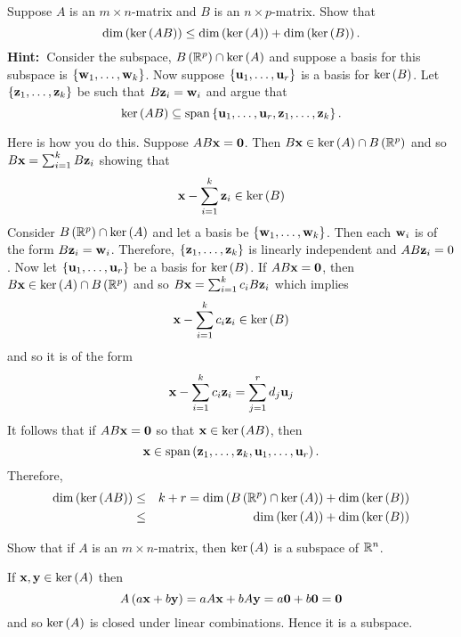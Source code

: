 \begin{enumialphparenastyle}
\begin{ex} Suppose $A$ is an $m\times n$-matrix and $B$ is an $n\times p$-matrix.
Show that 
\begin{equation*}
\dim \left(\ker \left(AB\right) \right) \leq \dim \left(\ker \left(
A\right) \right) +\dim \left(\ker \left(B\right) \right) .
\end{equation*}
\textbf{Hint:\ }Consider the subspace, $B\left(\mathbb{R}^{p}\right) \cap
\ker \left(A\right) $ and suppose a basis for this subspace is $\left\{
\mbox{\bf w}_{1},\ldots,\mbox{\bf w}_{k}\right\}$. Now suppose $\left\{
\mbox{\bf u}_{1},\ldots,\mbox{\bf u}_{r}\right\} $ is a basis for $\ker \left(
B\right)$. Let $\left\{\mbox{\bf z}_{1},\ldots,\mbox{\bf z}_{k}\right\} $ be
such that $B\mbox{\bf z}_{i}=\mbox{\bf w}_{i}$ and argue that 
\begin{equation*}
\ker \tup{AB} \subseteq \sspan\set{\vect{u}_{1},\ldots,
\vect{u}_{r},\vect{z}_{1},\ldots,\vect{z}_{k}} .
\end{equation*}
\vspace{1mm}
\begin{sol}
Here is how you do this. Suppose $AB\mbox{\bf x}=\mbox{\bf 0}$. Then $B\mbox{\bf x}\in \ker
\left(A\right) \cap B\left(\mathbb{R}^{p}\right) $ and so $B\mbox{\bf x}
=\sum_{i=1}^{k}B\mbox{\bf z}_{i}$ showing that
\[
\mbox{\bf x}-\sum_{i=1}^{k}\mbox{\bf z}_{i}\in \ker \left(B\right) 
\]
Consider $B\left(\mathbb{R}^{p}\right) \cap \ker \left(A\right) $ and let
a basis be $\left\{\mbox{\bf w}_{1},\ldots,\mbox{\bf w}_{k}\right\}$. Then
each $\mbox{\bf w}_{i}$ is of the form $B\mbox{\bf z}_{i}=\mbox{\bf w}_{i}$.
Therefore, $\left\{\mbox{\bf z}_{1},\ldots,\mbox{\bf z}_{k}\right\} $ is
linearly independent and $AB\mbox{\bf z}_{i}=0$. Now let $\left\{\mbox{\bf u}
_{1},\ldots,\mbox{\bf u}_{r}\right\} $ be a basis for $\ker \left(B\right)$.
If $AB\mbox{\bf x}=\mbox{\bf 0}$, then $B\mbox{\bf x} \in \ker \left(A\right) \cap B\left(
\mathbb{R}^{p}\right) $ and so $B\mbox{\bf x}=\sum_{i=1}^{k}c_{i}B\mbox{\bf z}
_{i}$ which implies
\[
\mbox{\bf x}-\sum_{i=1}^{k}c_{i}\mbox{\bf z}_{i}\in \ker \left(B\right)
\]
and so it is of the form
\[
\mbox{\bf x}-\sum_{i=1}^{k}c_{i}\mbox{\bf z}_{i}=\sum_{j=1}^{r}d_{j}\mbox{\bf u}
_{j}
\]
It follows that if $AB\mbox{\bf x}=\mbox{\bf 0}$ so that $\mbox{\bf x}\in \ker \left(
AB\right)$, then
\[
\vect{x}\in \sspan\tup{\vect{z}_{1},\ldots,\vect{z}_{k},
\vect{u}_{1},\ldots,\vect{u}_{r}} .
\]
Therefore,
\begin{eqnarray*}
\dim \left(\ker \left(AB\right) \right)  &\leq &k+r=\dim \left(B\left(
\mathbb{R}^{p}\right) \cap \ker \left(A\right) \right) +\dim \left(\ker
\left(B\right) \right)  \\
&\leq &\dim \left(\ker \left(A\right) \right) +\dim \left(\ker \left(
B\right) \right)
\end{eqnarray*}
\end{sol}
\end{ex}


\begin{ex} Show that if $A$ is an $m\times n$-matrix, then $\ker \left(A\right) $
is a subspace of $\mathbb{R}^n$.
\begin{sol}
If $\mbox{\bf x},\mbox{\bf y}\in \ker \left(A\right) $ then
\[
A\left(a\mbox{\bf x}+b\mbox{\bf y}\right) =aA\mbox{\bf x}+bA\mbox{\bf y}=a\mbox{\bf 0}
+b\mbox{\bf 0}=\mbox{\bf 0}
\]
and so $\ker \left(A\right) $ is closed under linear combinations. Hence it
is a subspace.
\end{sol}
\end{ex}

\end{enumialphparenastyle}
